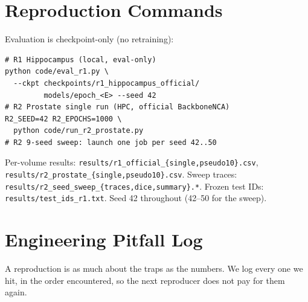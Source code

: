 \documentclass[10pt,twocolumn]{article}
\begin{document}
\appendix
\section{Reproduction Commands}
\label{app:cmd}
\small
Evaluation is checkpoint-only (no retraining):
\begin{verbatim}
# R1 Hippocampus (local, eval-only)
python code/eval_r1.py \
  --ckpt checkpoints/r1_hippocampus_official/
         models/epoch_<E> --seed 42
# R2 Prostate single run (HPC, official BackboneNCA)
R2_SEED=42 R2_EPOCHS=1000 \
  python code/run_r2_prostate.py
# R2 9-seed sweep: launch one job per seed 42..50
\end{verbatim}
Per-volume results: \texttt{results/r1\_official\_\{single,pseudo10\}.csv},
\texttt{results/r2\_prostate\_\{single,pseudo10\}.csv}. Sweep traces:
\texttt{results/r2\_seed\_sweep\_\{traces,dice,summary\}.*}. Frozen test
IDs: \texttt{results/test\_ids\_r1.txt}. Seed 42 throughout (42--50 for the
sweep).

\section{Engineering Pitfall Log}
\label{app:pitfalls}
\small
A reproduction is as much about the traps as the numbers. We log every one
we hit, in the order encountered, so the next reproducer does not pay for
them again.
\end{document}
